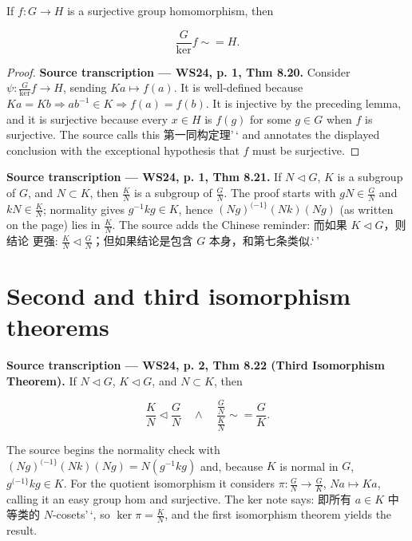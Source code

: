 \begin{theorem}{}

If \(f:G\rightarrow H\) is a surjective group homomorphism, then

\[\frac{G}{\ker}f \sim = H.\]

\end{theorem}

\begin{proof}

\textbf{Source transcription --- WS24, p. 1, Thm 8.20.} Consider \(\psi:\frac{G}{\ker}f\rightarrow H\), sending \(Ka\mapsto f(a)\). It is well-defined because \(Ka = Kb\Rightarrow ab^{- 1} \in K\Rightarrow f(a) = f(b)\). It is injective by the preceding lemma, and it is surjective because every \(x \in H\) is \(f(g)\) for some \(g \in G\) when \(f\) is surjective. The source calls this 第一同构定理'\,` and annotates the displayed conclusion with the exceptional hypothesis that \(f\) must be surjective.

\end{proof}

\textbf{Source transcription --- WS24, p. 1, Thm 8.21.} If \(N \lhd G\), \(K\) is a subgroup of \(G\), and \(N \subset K\), then \(\frac{K}{N}\) is a subgroup of \(\frac{G}{N}\). The proof starts with \(gN \in \frac{G}{N}\) and \(kN \in \frac{K}{N}\); normality gives \(g^{- 1}kg \in K\), hence \(\left( {Ng} \right)^{({- 1}\}}\left( {Nk} \right)\left( {Ng} \right)\) (as written on the page) lies in \(\frac{K}{N}\). The source adds the Chinese reminder: 而如果 \(K \lhd G\)，则结论 更强: \(\frac{K}{N} \lhd \frac{G}{N}\)；但如果结论是包含 \(G\) 本身，和第七条类似.`\,'

\section{Second and third isomorphism theorems}

\textbf{Source transcription --- WS24, p. 2, Thm 8.22 (Third Isomorphism Theorem).} If \(N \lhd G\), \(K \lhd G\), and \(N \subset K\), then

\[\frac{K}{N} \lhd \frac{G}{N}\quad \land \quad\frac{\frac{G}{N}}{\frac{K}{N}} \sim = \frac{G}{K}.\]

The source begins the normality check with \(\left( {Ng} \right)^{({- 1}\}}\left( {Nk} \right)\left( {Ng} \right) = N\left( {g^{- 1}kg} \right)\) and, because \(K\) is normal in \(G\), \(g^{({- 1}\}}kg \in K\). For the quotient isomorphism it considers \(\pi:\frac{G}{N}\rightarrow\frac{G}{K}\), \(Na\mapsto Ka\), calling it an easy group hom and surjective. The ker note says: 即所有 \(a \in K\) 中等类的 \(N\)-cosets'\,`, so \(\ker\pi = \frac{K}{N}\), and the first isomorphism theorem yields the result.

